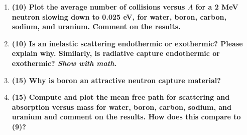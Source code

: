 \documentclass[11pt,a4paper]{article}
\begin{document}
\begin{enumerate}[leftmargin=*,topsep=0pt,font=\bfseries]
        
        
        
        
        
        
        
        
        
        \newpage
    \item\textbf{(10) Plot the average number of collisions versus $A$ for a 2 MeV neutron slowing down to 0.025 eV, for water, boron, carbon, sodium, and uranium. Comment on the results.}
        \vspace{0.25in}\\
        
        
        
        
        
        
        
        
        
        
        
        
        
        
        \newpage
    \item\textbf{(10) Is an inelastic scattering endothermic or exothermic? Please explain why. Similarly, is radiative capture endothermic or exothermic? \textit{Show with math.}}
        \vspace{0.25in}\\
        
        
        
        
        
        
        
        
        
        
        
        
        
        
        \newpage
    \item\textbf{(15) Why is boron an attractive neutron capture material?}
        \vspace{0.25in}\\
        
        
        
        
        
        
        
        
        
        
        
        
        
        \newpage
    \item\textbf{(15) Compute and plot the mean free path for scattering and absorption versus mass for water, boron, carbon, sodium, and uranium and comment on the results. How does this compare to (9)?}
        \vspace{0.25in}\\
        

\end{enumerate}
\end{document}
